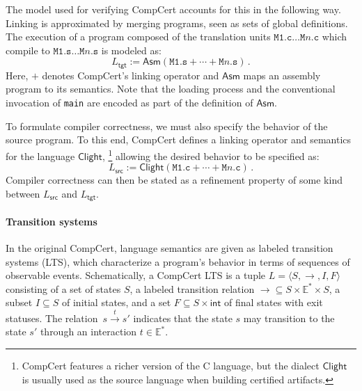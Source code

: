 \documentclass[sigplan,screen]{acmart}
\newcommand{\kw}[1]{\ensuremath{ \mathsf{#1} }}
\newcommand{\opt}[2]{#1}
\newcommand{\opt}[2]{#2}
\begin{document}
The model used for verifying CompCert accounts for this
    {in the following way.}
Linking is approximated by
merging programs, seen as sets of global definitions.
The execution
of a program composed of the translation units
$\texttt{M1.c} \ldots \texttt{M$n$.c}$
which compile to
$\texttt{M1.s} \ldots \texttt{M$n$.s}$
is modeled as:
\[
    L_\kw{tgt} :=
    \kw{Asm}(\texttt{M1.s} +
             \cdots +
             \texttt{M$n$.s}) \,.
\]
Here,
$+$ denotes CompCert's linking operator and
$\kw{Asm}$ maps an assembly program to its semantics.
Note that the loading process
and the conventional invocation of \texttt{main}
are encoded as part of the definition of $\kw{Asm}$.

To formulate compiler correctness,
we must also specify the behavior of the source program.
To this end,
CompCert defines a linking operator
and semantics
for the language $\kw{Clight}$,%
\footnote{
  CompCert features a richer version of the C language,
  but the dialect \kw{Clight}
  is usually used as the source language
  when building certified artifacts.
}
allowing the desired behavior to be specified as:
\[
    L_\kw{src} :=
    \kw{Clight}(\texttt{M1.c} + \cdots + \texttt{M$n$.c}) \,.
\]
Compiler correctness
can then be stated as
a refinement property of some kind
between $L_\kw{src}$ and $L_\kw{tgt}$.


\paragraph{Transition systems} %

In the original CompCert, language semantics are
given as labeled transition systems (LTS),
which characterize a program's behavior in terms of
sequences of observable events.
Schematically, a CompCert LTS
is a tuple
$L = \langle S, {\rightarrow}, I, F \rangle$
consisting of
a set of states $S$,
a labeled transition relation
${\rightarrow} \subseteq S \times \mathbb{E}^* \times S$,
a subset $I \subseteq S$ of initial states,
and a set
$F \subseteq S \times \kw{int}$
of final states with exit statuses.
The relation~$s \stackrel{t}{\rightarrow} s'$
indicates that the state $s$ may transition to the state $s'$
through an interaction $t \in \mathbb{E}^*$.
\end{document}
